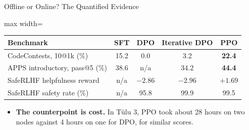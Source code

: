 \begin{frame}{Offline or Online? The Quantified Evidence}
    \begin{center}
    \small
    \begin{adjustbox}{max width=\linewidth}\begin{tabular}{lcccc}
        \toprule
        \textbf{Benchmark} & \textbf{SFT} & \textbf{DPO} & \textbf{Iterative DPO} & \textbf{PPO} \\
        \midrule
        CodeContests, 10@1k (\%) & 15.2 & \alert{0.0} & 3.2 & \textbf{22.4} \\
        APPS introductory, pass@5 (\%) & 38.6 & n/a & 34.2 & \textbf{44.4} \\
        SafeRLHF helpfulness reward & n/a & $-2.86$ & $-2.96$ & $\mathbf{+1.69}$ \\
        SafeRLHF safety rate (\%) & n/a & 95.8 & 99.9 & 99.5 \\
        \bottomrule
    \end{tabular}\end{adjustbox}
    \end{center}
    \begin{itemize}\itemsep0.4em
        \item \textbf{The counterpoint is cost.} In T\"ulu 3, PPO took about 28 hours on two nodes against 4 hours on one for DPO, for similar scores.
    \end{itemize}
\end{frame}

